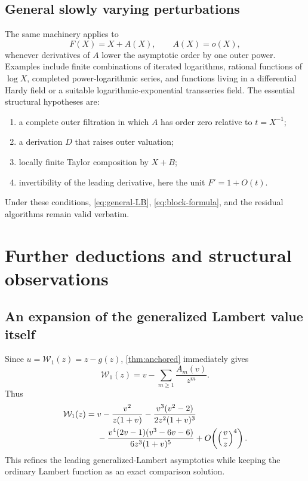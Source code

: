 \documentclass[11pt,oneside]{article}
\theoremstyle{plain}
\theoremstyle{definition}
\theoremstyle{remark}
\newcommand{\rW}{\mathcal{W}}
\begin{document}
\subsection{General slowly varying perturbations}

The same machinery applies to
\begin{equation}
 F(X)=X+A(X),
 \qquad A(X)=o(X),
 \label{eq:slow-general}
\end{equation}
whenever derivatives of \(A\) lower the asymptotic order by one outer power.
Examples include finite combinations of iterated logarithms, rational
functions of \(\log X\), completed power-logarithmic series, and functions
living in a differential Hardy field or a suitable logarithmic-exponential
transseries field.  The essential structural hypotheses are:
\begin{enumerate}
\item a complete outer filtration in which \(A\) has order zero relative to
      \(t=X^{-1}\);
\item a derivation \(D\) that raises outer valuation;
\item locally finite Taylor composition by \(X+B\);
\item invertibility of the leading derivative, here the unit
      \(F'=1+O(t)\).
\end{enumerate}
Under these conditions, \eqref{eq:general-LB}, \eqref{eq:block-formula}, and the
residual algorithms remain valid verbatim.

\section{Further deductions and structural observations}
\label{sec:further}

\subsection{An expansion of the generalized Lambert value itself}

Since \(u=\rW_1(z)=z-g(z)\), \cref{thm:anchored} immediately gives
\begin{equation}
 \rW_1(z)=v-\sum_{m\ge1}\frac{A_m(v)}{z^m}.
 \label{eq:rW1-expansion}
\end{equation}
Thus
\begin{align}
 \rW_1(z)={}&v-\frac{v^2}{z(1+v)}
 -\frac{v^3(v^2-2)}{2z^2(1+v)^3}\notag\\
 &-\frac{v^4(2v-1)(v^3-6v-6)}{6z^3(1+v)^5}
 +O\!\left(\left(\frac{v}{z}\right)^4\right).
 \label{eq:rW1-first}
\end{align}
This refines the leading generalized-Lambert asymptotics while keeping the
ordinary Lambert function as an exact comparison solution.
\end{document}
